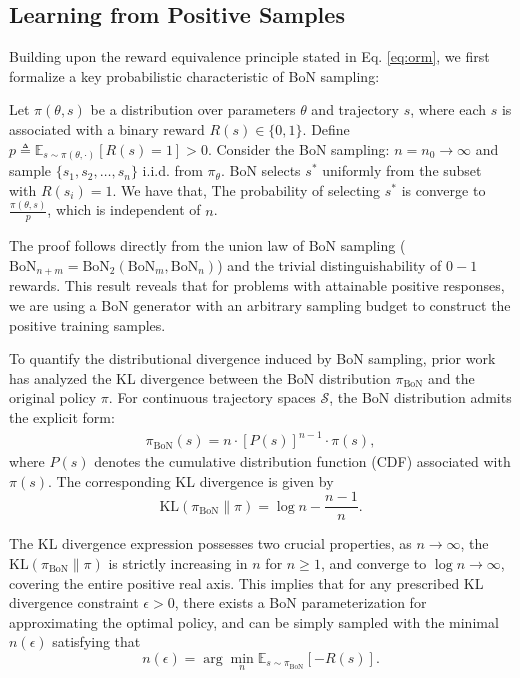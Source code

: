 \subsection{Learning from Positive Samples}\label{subsec:learn_from_positive}
Building upon the reward equivalence principle stated in Eq. \ref{eq:orm}, we first formalize a key probabilistic characteristic of BoN sampling:

\begin{lemma}\label{lemma:3.1}
Let $\pi(\theta, s)$ be a distribution over parameters $\theta$ and trajectory $s$, where each $s$ is associated with a binary reward $R(s) \in \{0, 1\}$. Define $p \triangleq \mathbb{E}_{s \sim \pi(\theta,\cdot)}[R(s) = 1] > 0$. Consider the BoN sampling:
$n = n_0 \to \infty$ and sample $\{s_1, s_2, \dots, s_n\}$ i.i.d. from $\pi_\theta$.
BoN selects $s^*$ uniformly from the subset with $R(s_i) = 1$. We have that,
The probability of selecting $s^*$ is converge to $\frac{\pi(\theta, s)}{p}$, which is independent of $n$.
\end{lemma}

The proof follows directly from the union law of BoN sampling ($\text{BoN}_{n+m} = \text{BoN}_2(\text{BoN}_m, \text{BoN}_n)$) and the trivial distinguishability of $0-1$ rewards. This result reveals that for problems with attainable positive responses, we are using a BoN generator with an arbitrary sampling budget to construct the positive training samples. 

To quantify the distributional divergence induced by BoN sampling, prior work~\cite{hilton2022measuring, scheurer2023training, coste2023reward} has analyzed the KL divergence between the BoN distribution $\pi_{\text{BoN}}$ and the original policy $\pi$. For continuous trajectory spaces $\mathcal{S}$, the BoN distribution admits the explicit form:
\begin{align}
\label{eq: pibon}
\pi_{\text{BoN}}(s) = n \cdot \left[P(s)\right]^{n-1} \cdot \pi(s),
\end{align}
where $P(s)$ denotes the cumulative distribution function (CDF) associated with $\pi(s)$. The corresponding KL divergence is given by
\[
\text{KL}(\pi_{\text{BoN}} \parallel \pi) = \log n - \frac{n-1}{n}.
\]

The KL divergence expression possesses two crucial properties, as $n \to \infty$, the $\text{KL}(\pi_{\text{BoN}}\parallel \pi)$ is strictly increasing in $n$ for $n \geq 1$, and converge to $\log n \to \infty$, covering the entire positive real axis.
This implies that for any prescribed KL divergence constraint $\epsilon > 0$, there exists a BoN parameterization for approximating the optimal policy, and can be simply sampled with the minimal $n(\epsilon)$ satisfying that
\[
n(\epsilon) = \arg\min_{n} \mathbb{E}_{s \sim \pi_{\text{BoN}}}[-R(s)].
\]

